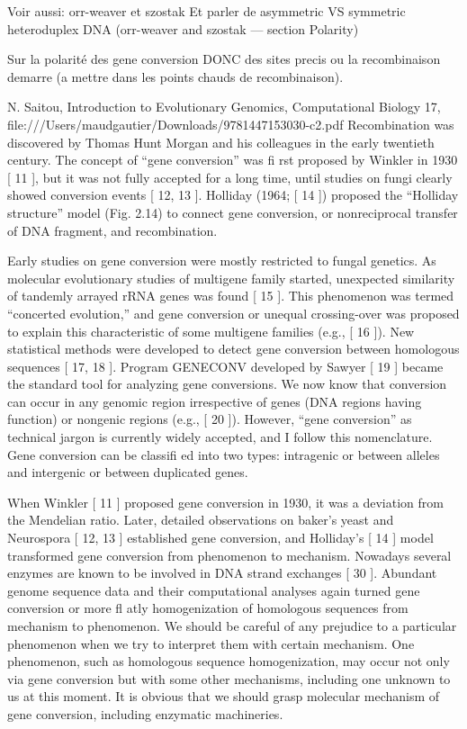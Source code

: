 Voir aussi: orr-weaver et szostak
Et parler de asymmetric VS symmetric heteroduplex DNA (orr-weaver and szostak — section Polarity)


Sur la polarité des gene conversion DONC des sites precis ou la recombinaison demarre (a mettre dans les points chauds de recombinaison).

N. Saitou, Introduction to Evolutionary Genomics, Computational Biology 17,
file:///Users/maudgautier/Downloads/9781447153030-c2.pdf
Recombination was discovered by Thomas Hunt Morgan and his colleagues in the
early twentieth century. The concept of “gene conversion” was fi rst proposed by
Winkler in 1930 [ 11  ], but it was not fully accepted for a long time, until studies on
fungi clearly showed conversion events [ 12, 13  ]. Holliday (1964; [ 14  ]) proposed the
“Holliday structure” model (Fig. 2.14) to connect gene conversion, or nonreciprocal
transfer of DNA fragment, and recombination.


Early studies on gene conversion were mostly restricted to fungal genetics. As
molecular evolutionary studies of multigene family started, unexpected similarity
of tandemly arrayed rRNA genes was found [ 15  ]. This phenomenon was termed
“concerted evolution,” and gene conversion or unequal crossing-over was proposed
to explain this characteristic of some multigene families (e.g., [ 16  ]). New statistical
methods were developed to detect gene conversion between homologous
sequences [ 17, 18  ]. Program GENECONV developed by Sawyer [ 19  ] became the
standard tool for analyzing gene conversions. We now know that conversion can
occur in any genomic region irrespective of genes (DNA regions having function)
or nongenic regions (e.g., [ 20  ]). However, “gene conversion” as technical jargon is
currently widely accepted, and I follow this nomenclature. Gene conversion can be
classifi ed into two types: intragenic or between alleles and intergenic or between
duplicated genes. 


When Winkler [ 11  ] proposed gene conversion in 1930, it was a deviation from
the Mendelian ratio. Later, detailed observations on baker’s yeast and Neurospora
[ 12, 13  ] established gene conversion, and Holliday’s [ 14  ] model transformed
gene conversion from phenomenon to mechanism. Nowadays several enzymes
are known to be involved in DNA strand exchanges [ 30  ]. Abundant genome
sequence data and their computational analyses again turned gene conversion or
more fl atly homogenization of homologous sequences from mechanism to phenomenon. We should be careful of any prejudice to a particular phenomenon when we
try to interpret them with certain mechanism. One phenomenon, such as homologous sequence homogenization, may occur not only via gene conversion but with
some other mechanisms, including one unknown to us at this moment. It is obvious
that we should grasp molecular mechanism of gene conversion, including enzymatic
machineries. 


